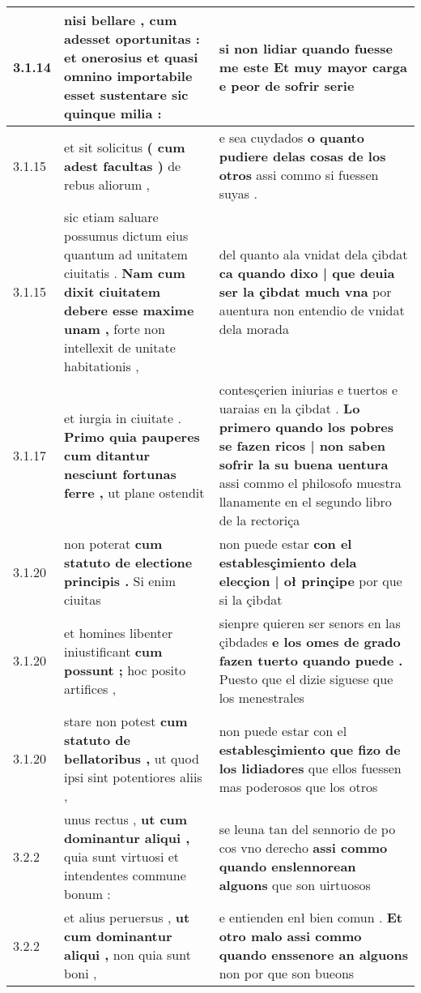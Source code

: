 \begin{tabular}{|p{1cm}|p{6.5cm}|p{6.5cm}|}
3.1.14 & nisi bellare , \textbf{ cum adesset oportunitas : } et onerosius et quasi omnino importabile esset sustentare sic quinque milia : & si non lidiar \textbf{ quando fuesse me este } Et muy mayor carga e peor de sofrir serie \\\hline
3.1.15 & et sit solicitus \textbf{ ( cum adest facultas ) } de rebus aliorum , & e sea cuydados \textbf{ o quanto pudiere delas cosas de los otros } assi commo si fuessen suyas . \\\hline
3.1.15 & sic etiam saluare possumus dictum eius quantum ad unitatem ciuitatis . \textbf{ Nam cum dixit ciuitatem debere esse maxime unam , } forte non intellexit de unitate habitationis , & del quanto ala vnidat dela çibdat \textbf{ ca quando dixo | que deuia ser la çibdat much vna } por auentura non entendio de vnidat dela morada \\\hline
3.1.17 & et iurgia in ciuitate . \textbf{ Primo quia pauperes cum ditantur nesciunt fortunas ferre , } ut plane ostendit & contesçerien iniurias e tuertos e uaraias en la çibdat . \textbf{ Lo primero quando los pobres se fazen ricos | non saben sofrir la su buena uentura } assi commo el philosofo muestra llanamente en el segundo libro de la rectoriça \\\hline
3.1.20 & non poterat \textbf{ cum statuto de electione principis . } Si enim ciuitas & non puede estar \textbf{ con el establesçimiento dela elecçion | oł prinçipe } por que si la çibdat \\\hline
3.1.20 & et homines libenter iniustificant \textbf{ cum possunt ; } hoc posito artifices , & sienpre quieren ser senors en las çibdades \textbf{ e los omes de grado fazen tuerto quando puede . } Puesto que el dizie siguese que los menestrales \\\hline
3.1.20 & stare non potest \textbf{ cum statuto de bellatoribus , } ut quod ipsi sint potentiores aliis , & non puede estar con el \textbf{ establesçimiento que fizo de los lidiadores } que ellos fuessen mas poderosos que los otros \\\hline
3.2.2 & unus rectus , \textbf{ ut cum dominantur aliqui , } quia sunt virtuosi et intendentes commune bonum : & se leuna tan del sennorio de po cos vno derecho \textbf{ assi commo quando enslennorean alguons } que son uirtuosos \\\hline
3.2.2 & et alius peruersus , \textbf{ ut cum dominantur aliqui , } non quia sunt boni , & e entienden enł bien comun . \textbf{ Et otro malo assi commo quando enssenore an alguons } non por que son bueons \\\hline

\end{tabular}
